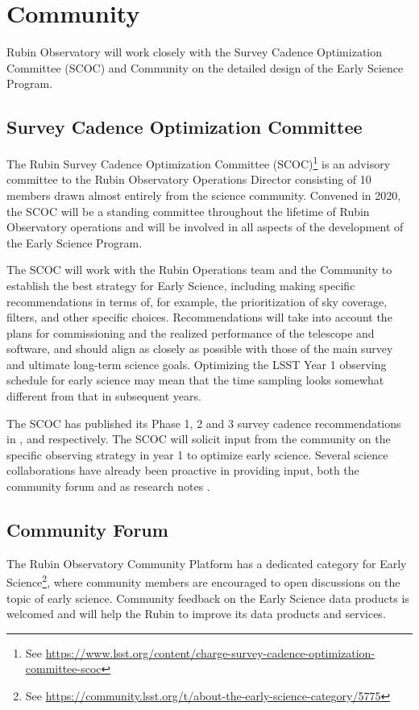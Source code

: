 \section{Community}
\label{sec:community}
Rubin Observatory will work closely with the Survey Cadence Optimization Committee (SCOC) and Community on the detailed design of the Early Science Program.

\subsection{Survey Cadence Optimization Committee}
The Rubin Survey Cadence Optimization Committee (SCOC)\footnote{See \url{https://www.lsst.org/content/charge-survey-cadence-optimization-committee-scoc}} is an advisory committee to the Rubin Observatory Operations Director consisting of 10 members drawn almost entirely from the science community.
Convened in 2020, the SCOC will be a standing committee throughout the lifetime of Rubin Observatory operations and will be involved in all aspects of the development of the Early Science Program.

The SCOC will work with the Rubin Operations team and the Community to establish the best strategy for Early Science, including making specific recommendations in terms of, for example, the prioritization of sky coverage, filters, and other specific choices.
Recommendations will take into account the plans for commissioning and the realized performance of the telescope and software, and should align as closely as possible with those of the main survey and ultimate long-term science goals.
Optimizing the LSST Year 1 observing schedule for early science may mean that the time sampling looks somewhat different from that in subsequent years.

The SCOC has published its Phase 1, 2  and 3 survey cadence recommendations in ,  and  respectively.
The SCOC will solicit input from the community on the specific observing strategy in year 1 to optimize early science.
Several science collaborations have already been proactive in providing input,  both the community forum and as research notes \citep[][]{2021RNAAS...5..143S,2020RNAAS...4...40H,2020RNAAS...4...41S}.

\subsection{Community Forum}
\label{ssec:forum}
The Rubin Observatory Community Platform has a dedicated category for Early Science\footnote{See \url{https://community.lsst.org/t/about-the-early-science-category/5775}}, where community members are encouraged to open discussions on the topic of early science.
Community feedback on the Early Science data products is welcomed and will help the Rubin to improve its data products and services.
